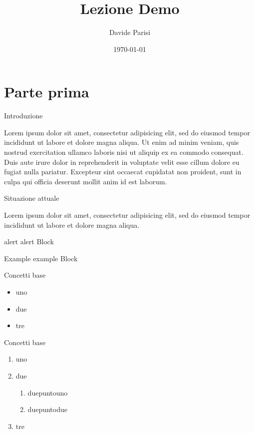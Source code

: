 \documentclass[italian,ignorenonframetext,]{beamer}
\title{Lezione Demo}
\author{Davide Parisi}
\institute{Università di Bari - ``Aldo Moro''}
\date{\today}
\providecommand{\tightlist}{%
  \setlength{\itemsep}{0pt}\setlength{\parskip}{0pt}}
\begin{document}
\frame{\titlepage}

\section{Parte prima}\label{parte-prima}

\begin{frame}{Introduzione}

Lorem ipsum dolor sit amet, consectetur adipisicing elit, sed do eiusmod
tempor incididunt ut labore et dolore magna aliqua. Ut enim ad minim
veniam, quis nostrud exercitation ullamco laboris nisi ut aliquip ex ea
commodo consequat. Duis aute irure dolor in reprehenderit in voluptate
velit esse cillum dolore eu fugiat nulla pariatur. Excepteur sint
occaecat cupidatat non proident, sunt in culpa qui officia deserunt
mollit anim id est laborum.

\end{frame}

\begin{frame}{Situazione attuale}

Lorem ipsum \alert{dolor} sit amet, consectetur adipisicing elit, sed do
eiusmod tempor incididunt ut labore et dolore magna aliqua.

\begin{alertblock}{alert}
  alert Block
\end{alertblock}


\begin{exampleblock}{Example}
  example Block
\end{exampleblock}

\end{frame}

\begin{frame}{Concetti base}

\begin{itemize}
\tightlist
\item
  uno
\item
  due
\item
  tre
\end{itemize}

\end{frame}

\begin{frame}{Concetti base}

\begin{enumerate}
\def\labelenumi{\arabic{enumi}.}
\tightlist
\item
  uno
\item
  due

  \begin{enumerate}
  \def\labelenumii{\arabic{enumii}.}
  \tightlist
  \item
    duepuntouno
  \item
    duepuntodue
  \end{enumerate}
\item
  tre
\end{enumerate}

\end{frame}
\end{document}

